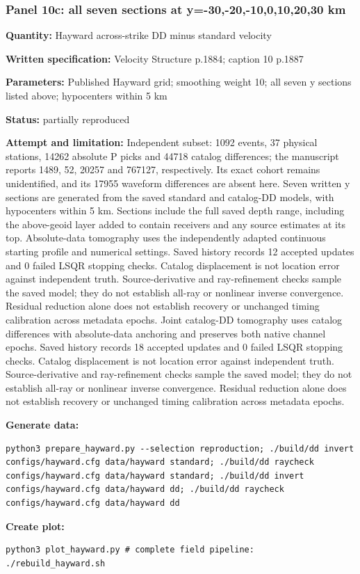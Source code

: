 \subsubsection*{Panel 10c: all seven sections at y=-30,-20,-10,0,10,20,30 km}
\noindent\textbf{Quantity:} Hayward across-strike DD minus standard velocity\par
\noindent\textbf{Written specification:} Velocity Structure p.1884; caption 10 p.1887\par
\noindent\textbf{Parameters:} Published Hayward grid; smoothing weight 10; all seven y sections listed above; hypocenters within 5 km\par
\noindent\textbf{Status:} partially reproduced\par
\noindent\textbf{Attempt and limitation:} Independent subset: 1092 events, 37 physical stations, 14262 absolute P picks and 44718 catalog differences; the manuscript reports 1489, 52, 20257 and 767127, respectively. Its exact cohort remains unidentified, and its 17955 waveform differences are absent here. Seven written y sections are generated from the saved standard and catalog-DD models, with hypocenters within 5 km. Sections include the full saved depth range, including the above-geoid layer added to contain receivers and any source estimates at its top. Absolute-data tomography uses the independently adapted continuous starting profile and numerical settings. Saved history records 12 accepted updates and 0 failed LSQR stopping checks. Catalog displacement is not location error against independent truth. Source-derivative and ray-refinement checks sample the saved model; they do not establish all-ray or nonlinear inverse convergence. Residual reduction alone does not establish recovery or unchanged timing calibration across metadata epochs. Joint catalog-DD tomography uses catalog differences with absolute-data anchoring and preserves both native channel epochs. Saved history records 18 accepted updates and 0 failed LSQR stopping checks. Catalog displacement is not location error against independent truth. Source-derivative and ray-refinement checks sample the saved model; they do not establish all-ray or nonlinear inverse convergence. Residual reduction alone does not establish recovery or unchanged timing calibration across metadata epochs.\par
\noindent\textbf{Generate data:}
\begin{lstlisting}
python3 prepare_hayward.py --selection reproduction; ./build/dd invert configs/hayward.cfg data/hayward standard; ./build/dd raycheck configs/hayward.cfg data/hayward standard; ./build/dd invert configs/hayward.cfg data/hayward dd; ./build/dd raycheck configs/hayward.cfg data/hayward dd
\end{lstlisting}
\noindent\textbf{Create plot:}
\begin{lstlisting}
python3 plot_hayward.py # complete field pipeline: ./rebuild_hayward.sh
\end{lstlisting}
